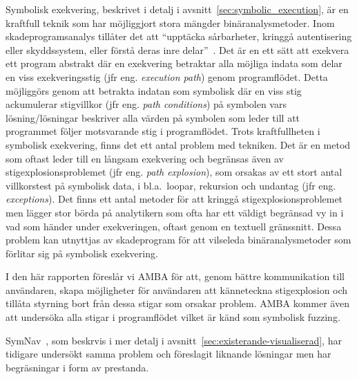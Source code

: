 Symbolisk exekvering, beskrivet i detalj i avsnitt~\ref{sec:symbolic_execution},
är en kraftfull teknik som har möjliggjort stora mängder
binäranalysmetoder\cite{survey_symb_exc, symnav}. Inom skadeprogramsanalys
tillåter det att ``upptäcka sårbarheter, kringgå autentisering eller
skyddssystem, eller förstå deras inre delar''~\cite{symnav}. Det är en ett sätt
att exekvera ett program abstrakt där en exekvering betraktar alla möjliga
indata som delar en viss exekveringsstig (jfr eng. \emph{execution path}) genom
programflödet. Detta möjliggörs genom att betrakta indatan som symbolisk där en
viss stig ackumulerar stigvillkor (jfr eng. \emph{path conditions}) på symbolen
vars lösning/lösningar beskriver alla värden på symbolen som leder till att
programmet följer motsvarande stig i programflödet. Trots kraftfullheten i
symbolisk exekvering, finns det ett antal problem med tekniken. Det är en metod
som oftast leder till en långsam exekvering och begränsas även av
stigexplosionsproblemet (jfr eng. \emph{path explosion}), som orsakas av ett
stort antal villkorstest på symbolisk data, i bl.a.\ loopar, rekursion och
undantag (jfr eng. \emph{exceptions}). Det finns ett antal metoder för att
kringgå stigexplosionsproblemet men lägger stor börda på analytikern som ofta
har ett väldigt begränsad vy in i vad som händer under exekveringen, oftast
genom en textuell gränssnitt. Dessa problem kan utnyttjas av skadeprogram för
att vilseleda binäranalysmetoder som förlitar sig på symbolisk exekvering.

I den här rapporten föreslår vi AMBA för att, genom bättre kommunikation till
användaren, skapa möjligheter för användaren att känneteckna stigexplosion och
tillåta styrning bort från dessa stigar som orsakar problem. AMBA kommer även
att undersöka alla stigar i programflödet vilket är känd som symbolisk fuzzing.

SymNav~\cite{symnav}, som beskrvis i mer detalj i
avsnitt~\ref{sec:existerande-visualiserad}, har tidigare undersökt samma problem och
föreslagit liknande lösningar men har begräsningar i form av prestanda.



%
